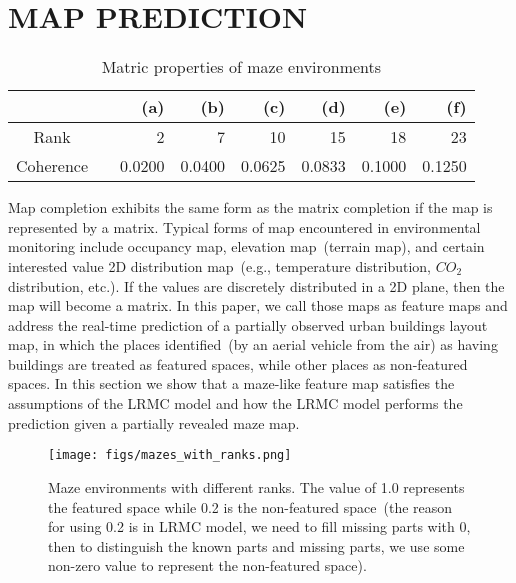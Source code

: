 \section{MAP PREDICTION}
\label{sec:map_completion}

\begin{table*}[t]
\caption{Matric properties of maze environments} %
\centering %
\begin{tabular}{c rrrrrrr} %
\hline\hline %
  & \vline & (a) & (b) & (c) & (d) & (e) & (f)\\
\hline %
Rank & \vline & 2 & 7 & 10 & 15 & 18 & 23\\ %
Coherence & \vline & 0.0200 & 0.0400 & 0.0625 & 0.0833 & 0.1000 & 0.1250\\ %
\hline %
\end{tabular}
\label{tb:maze_prop}
\end{table*}

Map completion exhibits the same form as the matrix completion if the map is represented by a matrix. Typical forms of map encountered in environmental monitoring include occupancy map, elevation map~(terrain map), and certain interested value 2D distribution map~(e.g., temperature distribution, $CO_2$ distribution, etc.). If the values are discretely distributed in a 2D plane, then the map will become a matrix. In this paper, we call those maps as feature maps and address the real-time prediction of a partially observed urban buildings layout map, in which the places identified~(by an aerial vehicle from the air) as having buildings are treated as featured spaces, while other places as non-featured spaces. In this section we show that a maze-like feature map satisfies the assumptions of the LRMC model and how the LRMC model performs the prediction given a partially revealed maze map.

\begin{figure} \vspace{-3pt}
  \centering
  	{\label{fig:mazes_1}\texttt{[image: figs/mazes\_with\_ranks.png]}}
  \caption{\small Maze environments with different ranks. The value of 1.0 represents the featured space while 0.2 is the non-featured space~(the reason for using 0.2 is in LRMC model, we need to fill missing parts with 0, then to distinguish the known parts and missing parts, we use some non-zero value to represent the non-featured space).
  } \vspace{-10pt}
\label{fig:mazes_1}  
\end{figure}

